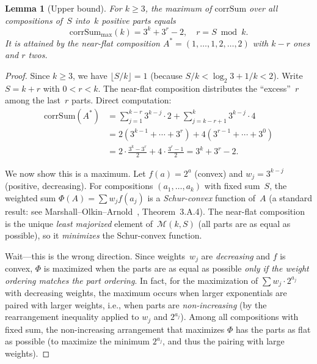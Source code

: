 \documentclass[11pt, a4paper]{amsart}
\theoremstyle{plain}
\newtheorem{lemma}[theorem]{Lemma}
\theoremstyle{definition}
\theoremstyle{remark}
\newcommand{\corrSum}{\mathrm{corrSum}}
\newcommand{\Mono}{\mathcal{M}}
\begin{document}
\begin{lemma}[Upper bound]\label{lem:cs-max}
  For $k \geq 3$, the maximum of $\corrSum$ over all
  compositions of~$S$ into~$k$ positive parts equals
  \begin{equation}\label{eq:cs-max}
    \corrSum_{\max}(k) = 3^k + 3^r - 2,
    \quad r = S \bmod k.
  \end{equation}
  It is attained by the near-flat composition
  $A^* = (1, \ldots, 1, 2, \ldots, 2)$ with $k - r$ ones
  and $r$ twos.
\end{lemma}

\begin{proof}
  Since $k \geq 3$, we have $\lfloor S/k \rfloor = 1$
  (because $S/k < \log_2 3 + 1/k < 2$).
  Write $S = k + r$ with $0 < r < k$.
  The near-flat composition distributes the ``excess''~$r$
  among the last~$r$ parts.  Direct computation:
  \begin{align*}
    \corrSum(A^*)
    &= \sum_{j=1}^{k-r} 3^{k-j} \cdot 2
       + \sum_{j=k-r+1}^{k} 3^{k-j} \cdot 4 \\
    &= 2(3^{k-1} + \cdots + 3^r)
       + 4(3^{r-1} + \cdots + 3^0) \\
    &= 2 \cdot \frac{3^k - 3^r}{2}
       + 4 \cdot \frac{3^r - 1}{2}
    = 3^k + 3^r - 2.
  \end{align*}

  We now show this is a maximum.  Let $f(a) = 2^a$
  (convex) and $w_j = 3^{k-j}$ (positive, decreasing).
  For compositions $(a_1, \ldots, a_k)$ with fixed
  sum~$S$, the weighted sum $\Phi(A) = \sum w_j f(a_j)$
  is a \emph{Schur-convex} function of~$A$
  (a standard result: see Marshall--Olkin--Arnold~\cite{MOA2011},
  Theorem~3.A.4).  The near-flat composition is the unique
  \emph{least majorized} element of~$\Mono(k,S)$
  (all parts are as equal as possible), so it \emph{minimizes}
  the Schur-convex function.

  Wait---this is the wrong direction.
  Since weights~$w_j$ are \emph{decreasing} and $f$ is convex,
  $\Phi$ is maximized when the parts are as equal as possible
  \emph{only if the weight ordering matches the part ordering}.
  In fact, for the maximization of $\sum w_j \cdot 2^{a_j}$
  with decreasing weights, the maximum occurs when larger
  exponentials are paired with larger weights, i.e., when
  parts are \emph{non-increasing} (by the rearrangement
  inequality applied to $w_j$ and $2^{a_j}$).  Among
  all compositions with fixed sum, the non-increasing
  arrangement that maximizes $\Phi$ has the parts as flat
  as possible (to maximize the minimum $2^{a_j}$, and thus
  the pairing with large weights).


\end{proof}
\end{document}
